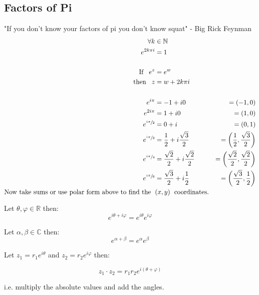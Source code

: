 \subsection{Factors of Pi}
\begin{defn}
	"If you don't know your factors of pi you don't know squat" - Big Rick Feynman
	\begin{align*}
		\forall k &\in \mathbb{N} \\
		e^{2k\pi i} &= 1 \\
		\\
		\text{If} \;\;\; e^z &= e^w \\ 
		\text{then} \;\;\; z &= w + 2k\pi i \\
		\\
		e^{i\pi} &= -1 + i0 
		&= (-1, 0) \\
		e^{2i\pi} &= 1 + i0 
		&= (1, 0) \\ 
		e^{\sfrac{i\pi}{2}} &= 0 +  i  
		&= (0, 1) \\
		e^{\sfrac{i\pi}{3}} &= \frac{1}{2} + i\frac{\sqrt{3}}{2} 
		&= \left(\frac{1}{2}, \frac{\sqrt{3}}{2} \right) \\
		e^{\sfrac{i\pi}{4}} &= \frac{\sqrt{2}}{2} + i\frac{\sqrt{2}}{2} 
		&= \left( \frac{\sqrt{2}}{2}, \frac{\sqrt{2}}{2} \right) \\
		e^{\sfrac{i\pi}{6}} &= \frac{\sqrt{3}}{2} + i\frac{1}{2} 
		&= \left( \frac{\sqrt{3}}{2}, \frac{1}{2} \right)  \\
		\text{Now take sums or use polar form above to find the \;} &(x, y) \text{\; coordinates.}
	\end{align*}
\end{defn}
 
\begin{thm}
	Let $\theta, \varphi \in \mathbb{R}$ then:
	\[e^{i\theta + i\varphi} = e^{i\theta}e^{i\varphi}\]
\end{thm}
\begin{thm}
	Let $\alpha, \beta \in \mathbb{C}$ then:
	\[e^{\alpha + \beta} = e^{\alpha}e^{\beta}\]
\end{thm}
\begin{thm}
	Let $z_1 = r_1 e^{i\theta}$ and $z_2 = r_2 e^{i\varphi}$ then:

	\[z_1 \cdot z_2 = r_1 r_2 e^{i(\theta + \varphi)} \]

	i.e. multiply the absolute values and add the angles.
\end{thm}


